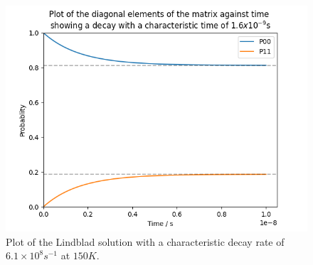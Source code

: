 \begin{figure}
    \centering
    \includegraphics[width=.5\linewidth]{Figures/Redfield/Plot of lindblad solution.png}
    \caption{Plot of the Lindblad solution with a characteristic decay
    rate of \(6.1\times{}10^{8}s^{-1}\) at
    \(150K\).
    }\label{fig:two site Lindblad soluton}
\end{figure}


